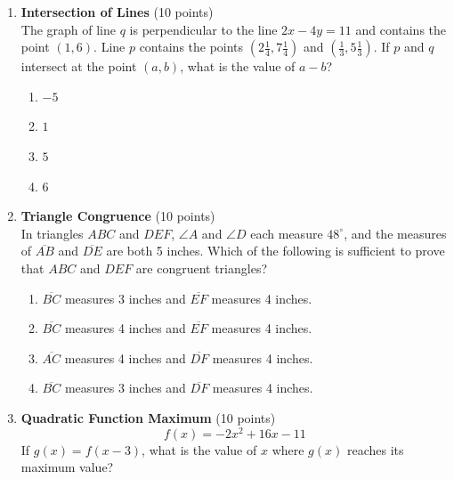 \begin{enumerate}
  \item \textbf{Intersection of Lines} (10 points)\\
  The graph of line $q$ is perpendicular to the line $2x - 4y = 11$ and contains the point $(1, 6)$. Line $p$ contains the points $\left(2 \frac{1}{4}, 7 \frac{1}{4}\right)$ and $\left(\frac{1}{3}, 5 \frac{1}{3}\right)$. If $p$ and $q$ intersect at the point $(a, b)$, what is the value of $a - b$?
  \begin{enumerate}[label=\Alph*.]
    \item $-5$
    \item $1$
    \item $5$
    \item $6$
  \end{enumerate}
  \begin{subanswer}
  \end{subanswer}

  \newpage

  \item \textbf{Triangle Congruence} (10 points)\\
  In triangles $ABC$ and $DEF$, $\angle A$ and $\angle D$ each measure $48^\circ$, and the measures of $\overline{AB}$ and $\overline{DE}$ are both 5 inches. Which of the following is sufficient to prove that $ABC$ and $DEF$ are congruent triangles?
  \begin{enumerate}[label=\Alph*.]
    \item $\overline{BC}$ measures 3 inches and $\overline{EF}$ measures 4 inches.
    \item $\overline{BC}$ measures 4 inches and $\overline{EF}$ measures 4 inches.
    \item $\overline{AC}$ measures 4 inches and $\overline{DF}$ measures 4 inches.
    \item $\overline{BC}$ measures 3 inches and $\overline{DF}$ measures 4 inches.
  \end{enumerate}
  \begin{subanswer}
  \end{subanswer}

  \item \textbf{Quadratic Function Maximum} (10 points)\\
  \[
    f(x) = -2x^2 + 16x - 11
  \]
  If $g(x) = f(x - 3)$, what is the value of $x$ where $g(x)$ reaches its maximum value?
  \begin{subanswer}
  \end{subanswer}


\end{enumerate}
